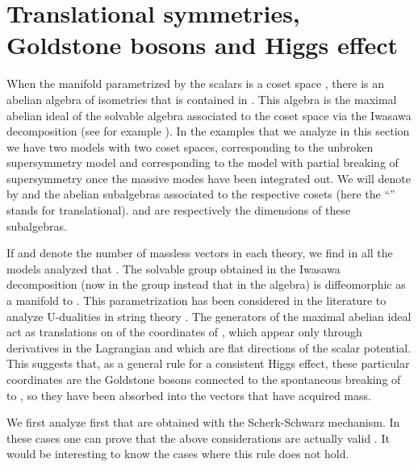 \documentclass[a4paper,12pt]{article}
\begin{document}
\section{Translational symmetries, Goldstone bosons and Higgs effect}

When the manifold parametrized by the scalars is a coset space
\coordHE{}, there is an abelian  algebra of isometries that is
contained in \coordHE{}. This algebra is the maximal abelian ideal of the
solvable algebra associated to the coset space via the Iwasawa
decomposition (see for example \cite{he}).  In the examples that
we analyze in this section we have two models with two coset
spaces, \coordHE{} corresponding to the unbroken supersymmetry model
and \coordHE{} corresponding to the model with partial breaking of
supersymmetry once  the massive modes have been integrated out.
We will denote by \coordHE{} and \coordHE{} the abelian
subalgebras associated to the respective cosets (here the
``\myHighlight{$\ft$}\coordHE{}'' stands for translational). \coordHE{} and \coordHE{} are respectively
the dimensions of these  subalgebras.

If \coordHE{} and \coordHE{} denote the number of massless  vectors in each
theory, we find  in  all the models analyzed that \coordHE{}.
The solvable group obtained in the Iwasawa decomposition (now in
the group instead that in the algebra) is diffeomorphic as a
manifold to \coordHE{}.  This parametrization has been considered in
the literature to analyze U-dualities in string theory
\cite{adfft,lps,cj}. The generators of the maximal abelian ideal
act as  translations on \coordHE{} of the coordinates of \coordHE{}, which
appear only through derivatives in the Lagrangian and
 which are flat directions of  the scalar potential. This suggests that, as a general
rule for a consistent Higgs effect, these particular coordinates
are the Goldstone bosons connected to the spontaneous breaking of
\coordHE{} to \coordHE{}, so they have been absorbed into the
vectors that have acquired mass.

We first analyze first  that are obtained with the
Scherk-Schwarz mechanism. In  these cases one can prove that the
above considerations are actually valid \cite{adfl1}. It
would be interesting to know the cases where this rule does not
hold.
\end{document}
